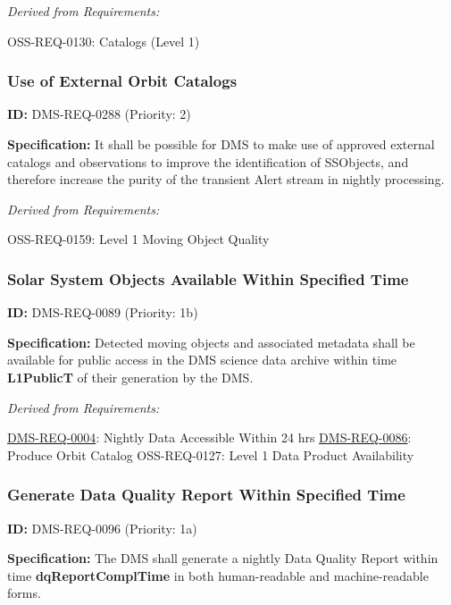 \documentclass[SE,toc,lsstdraft]{lsstdoc}
\begin{document}
\emph{Derived from Requirements:}

OSS-REQ-0130:
Catalogs (Level 1) \newline

\subsubsection{Use of External Orbit Catalogs}

\label{DMS-REQ-0288}
\textbf{ID:} DMS-REQ-0288 (Priority: 2)

\textbf{Specification:} It shall be possible for DMS to make use of approved external catalogs and observations to improve the identification of SSObjects, and therefore increase the purity of the transient Alert stream in nightly processing.

\emph{Derived from Requirements:}

OSS-REQ-0159:
Level 1 Moving Object Quality \newline

\subsubsection{Solar System Objects Available Within Specified Time}

\label{DMS-REQ-0089}
\textbf{ID:} DMS-REQ-0089 (Priority: 1b)

\textbf{Specification:} Detected moving objects and associated metadata shall be available for public access in the DMS science data archive within time \textbf{L1PublicT }of their generation by the DMS.

\emph{Derived from Requirements:}

\hyperref[DMS-REQ-0004]{DMS-REQ-0004}:
Nightly Data Accessible Within 24 hrs \newline
\hyperref[DMS-REQ-0086]{DMS-REQ-0086}:
Produce Orbit Catalog \newline
OSS-REQ-0127:
Level 1 Data Product Availability \newline

\subsubsection{Generate Data Quality Report Within Specified Time}

\label{DMS-REQ-0096}
\textbf{ID:} DMS-REQ-0096 (Priority: 1a)

\textbf{Specification:} The DMS shall generate a nightly Data Quality Report within time \textbf{dqReportComplTime }in both human-readable and machine-readable forms.
\end{document}
